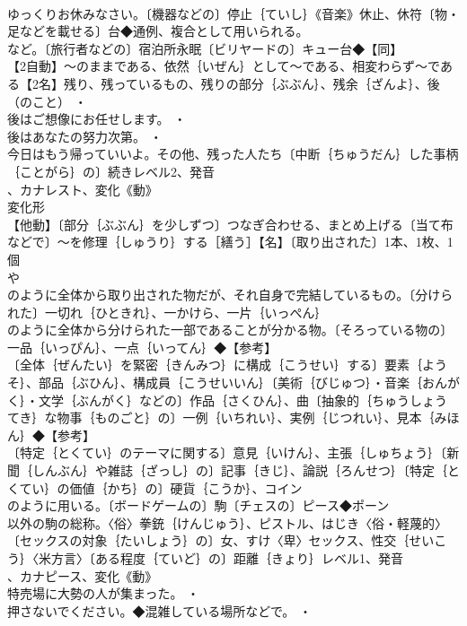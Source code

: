 \documentclass[8pt]{extreport}
\begin{document}
\begin{CJK}{UTF8}{min}
\\	ゆっくりお休みなさい。〔機器などの〕停止｛ていし｝《音楽》休止、休符〔物・足などを載せる〕台◆通例、複合として用いられる。
\\	など。〔旅行者などの〕宿泊所永眠〔ビリヤードの〕キュー台◆【同】
\\	【2自動】～のままである、依然｛いぜん｝として～である、相変わらず～である【2名】残り、残っているもの、残りの部分｛ぶぶん｝、残余｛ざんよ｝、後（のこと） ・
\\	後はご想像にお任せします。 ・
\\	後はあなたの努力次第。 ・
\\	今日はもう帰っていいよ。その他、残った人たち〔中断｛ちゅうだん｝した事柄｛ことがら｝の〕続きレベル2、発音
\\	、カナレスト、変化《動》
\\	変化形 
\\	【他動】〔部分｛ぶぶん｝を少しずつ〕つなぎ合わせる、まとめ上げる〔当て布などで〕～を修理｛しゅうり｝する［繕う］【名】〔取り出された〕1本、1枚、1個
\\	や
\\	のように全体から取り出された物だが、それ自身で完結しているもの。〔分けられた〕一切れ｛ひときれ｝、一かけら、一片｛いっぺん｝
\\	のように全体から分けられた一部であることが分かる物。〔そろっている物の〕一品｛いっぴん｝、一点｛いってん｝◆【参考】
\\	〔全体｛ぜんたい｝を緊密｛きんみつ｝に構成｛こうせい｝する〕要素｛ようそ｝、部品｛ぶひん｝、構成員｛こうせいいん｝〔美術｛びじゅつ｝・音楽｛おんがく｝・文学｛ぶんがく｝などの〕作品｛さくひん｝、曲〔抽象的｛ちゅうしょう てき｝な物事｛ものごと｝の〕一例｛いちれい｝、実例｛じつれい｝、見本｛みほん｝◆【参考】
\\	〔特定｛とくてい｝のテーマに関する〕意見｛いけん｝、主張｛しゅちょう｝〔新聞｛しんぶん｝や雑誌｛ざっし｝の〕記事｛きじ｝、論説｛ろんせつ｝〔特定｛とくてい｝の価値｛かち｝の〕硬貨｛こうか｝、コイン
\\	のように用いる。〔ボードゲームの〕駒〔チェスの〕ピース◆ポーン
\\	以外の駒の総称。〈俗〉拳銃｛けんじゅう｝、ピストル、はじき〈俗・軽蔑的〉〔セックスの対象｛たいしょう｝の〕女、すけ〈卑〉セックス、性交｛せいこう｝〈米方言〉〔ある程度｛ていど｝の〕距離｛きょり｝レベル1、発音
\\	、カナピース、変化《動》
\\	特売場に大勢の人が集まった。 ・
\\	押さないでください。◆混雑している場所などで。 ・

\end{CJK}
\end{document}
